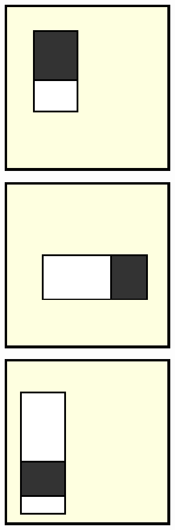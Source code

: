 \documentclass[times, utf8, zavrsni, numeric]{fer}
\begin{document}
\begin{figure}[th!]
    \centering
    \begin{subfigure}{.25\textwidth}
        \centering
        \includegraphics[width=.5\linewidth]{Images/Haar_VD.pdf}
        \captionsetup{justification=centering}
        \caption{}
        \label{fig:haar1}
    \end{subfigure}%
    \begin{subfigure}{.25\textwidth}
        \centering
        \includegraphics[width=.5\linewidth]{Images/Haar_HD.pdf}
        \captionsetup{justification=centering}
        \caption{}
        \label{fig:haar2}
    \end{subfigure}%
    \begin{subfigure}{.25\textwidth}
        \centering
        \includegraphics[width=.5\linewidth]{Images/Haar_VT.pdf}

\end{subfigure}
\end{figure}
\end{document}
